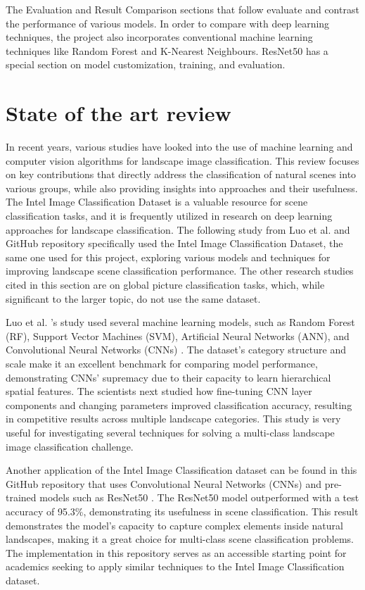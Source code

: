 \documentclass[conference]{IEEEtran}
\begin{document}
The Evaluation and Result Comparison sections that follow evaluate and contrast the performance of various models. In order to compare with deep learning techniques, the project also incorporates conventional machine learning techniques like Random Forest and K-Nearest Neighbours. ResNet50 has a special section on model customization, training, and evaluation.

\section{State of the art review}
In recent years, various studies have looked into the use of machine learning and computer vision algorithms for landscape image classification. This review focuses on key contributions that directly address the classification of natural scenes into various groups, while also providing insights into approaches and their usefulness. The Intel Image Classification Dataset is a valuable resource for scene classification tasks, and it is frequently utilized in research on deep learning approaches for landscape classification. The following study from Luo et al. and GitHub repository specifically used the Intel Image Classification Dataset, the same one used for this project, exploring various models and techniques for improving landscape scene classification performance. The other research studies cited in this section are on global picture classification tasks, which, while significant to the larger topic, do not use the same dataset.

Luo et al. 's study used several machine learning models, such as Random Forest (RF), Support Vector Machines (SVM), Artificial Neural Networks (ANN), and Convolutional Neural Networks (CNNs) \cite{luo2019}. The dataset's category structure and scale make it an excellent benchmark for comparing model performance, demonstrating CNNs' supremacy due to their capacity to learn hierarchical spatial features. The scientists next studied how fine-tuning CNN layer components and changing parameters improved classification accuracy, resulting in competitive results across multiple landscape categories. This study is very useful for investigating several techniques for solving a multi-class landscape image classification challenge.

 Another application of the Intel Image Classification dataset can be found in this GitHub repository that uses Convolutional Neural Networks (CNNs) and pre-trained models such as ResNet50 \cite{githubpratim}. The ResNet50 model outperformed with a test accuracy of 95.3\%, demonstrating its usefulness in scene classification. This result demonstrates the model's capacity to capture complex elements inside natural landscapes, making it a great choice for multi-class scene classification problems. The implementation in this repository serves as an accessible starting point for academics seeking to apply similar techniques to the Intel Image Classification dataset.
\end{document}
